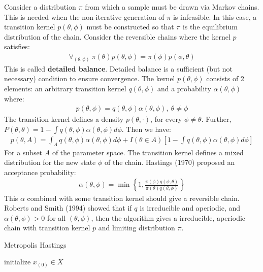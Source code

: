 \documentclass[paper=a4, fontsize=12pt]{scrartcl} %
\numberwithin{equation}{section} %
\numberwithin{figure}{section} %
\numberwithin{table}{section} %
\begin{document}
Consider a distribution $\pi$ from which a sample must be drawn via Markov chains. This is needed when the non-iterative generation of $\pi$ is infeasible.
In this case, a transition kernel $p(\theta, \phi)$ must be constructed so that $\pi$ is the equilibrium distribution of the chain.
Consider the reversible chains where the kernel $p$ satisfies:
\begin{align*}
    \forall_{(\theta, \phi)}\ \pi(\theta)p(\theta, \phi) = \pi(\phi)p(\phi, \theta)
\end{align*}
This is called \textbf{detailed balance}. Detailed balance is a sufficient (but not necessary) condition to ensure convergence.
The kernel $p(\theta, \phi)$ consists of 2 elements: an arbitrary transition kernel $q(\theta, \phi)$ and a probability $\alpha(\theta, \phi)$ where:
\begin{align*}
    p(\theta, \phi) = q(\theta, \phi) \alpha(\theta, \phi),\ \theta \neq \phi
\end{align*}
The transition kernel defines a density $p(\theta, \cdot)$, for every $\phi \neq \theta$. Further, $P(\theta, \theta) = 1 - \int q(\theta, \phi) \alpha(\theta, \phi) d\phi$. 
Then we have:
\begin{align*}
    p(\theta, A) = \int_A q(\theta, \phi) \alpha(\theta, \phi) d\phi + I(\theta \in A) \left[1 - \int q(\theta, \phi) \alpha(\theta, \phi) d\phi \right]
\end{align*}
For a subset $A$ of the parameter space. The transition kernel defines a mixed distribution for the new state $\phi$ of the chain.
Hastings (1970) proposed an acceptance probability:
\begin{align*}
    \alpha(\theta, \phi) = \min \left\{ 1, \frac{\pi(\phi)q(\phi, \theta)}{\pi(\theta)q(\theta, \phi)} \right\}
\end{align*}
This $\alpha$ combined with some transition kernel should give a reversible chain. 
Roberts and Smith (1994) showed that if $q$ is irreducible and aperiodic, and $\alpha(\theta, \phi) > 0$ for 
all $(\theta, \phi)$, then the algorithm gives a irreducible, aperiodic chain with transition kernel $p$ and limiting distribution $\pi$.

\begin{algorithm}[H]
    \caption{Metropolis Hastings}
    \SetAlgoLined
    initialize $x_{(0)} \in X$

\end{algorithm}
\end{document}
